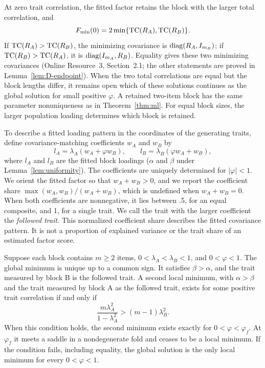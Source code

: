 At zero trait correlation, the fitted factor retains the block with the larger total correlation, and
\[
F_{\min}(0)=2\min\{\operatorname{TC}(R_A),\operatorname{TC}(R_B)\}.
\]
If $\operatorname{TC}(R_A)>\operatorname{TC}(R_B)$, the minimizing covariance is $\operatorname{diag}(R_A,I_{m_B})$; if $\operatorname{TC}(R_B)>\operatorname{TC}(R_A)$, it is $\operatorname{diag}(I_{m_A},R_B)$. Equality gives these two minimizing covariances (Online Resource~3, Section~2.1; the other statements are proved in Lemma~\ref{lem:D-endpoint}). When the two total correlations are equal but the block lengths differ, it remains open which of these solutions continues as the global solution for small positive $\varphi$. A retained two-item block has the same parameter nonuniqueness as in Theorem~\ref{thm:ml}. For equal block sizes, the larger population loading determines which block is retained.

To describe a fitted loading pattern in the coordinates of the generating traits, define covariance-matching coefficients $w_A$ and $w_B$ by
\[
l_A=\lambda_A(w_A+\varphi w_B),\qquad
l_B=\lambda_B(\varphi w_A+w_B),
\]
where $l_A$ and $l_B$ are the fitted block loadings ($\alpha$ and $\beta$ under Lemma~\ref{lem:uniformity}). The coefficients are uniquely determined for $|\varphi|<1$. We orient the fitted factor so that $w_A+w_B>0$, and we report the coefficient share $\max(w_A,w_B)/(w_A+w_B)$, which is undefined when $w_A+w_B=0$. When both coefficients are nonnegative, it lies between .5, for an equal composite, and 1, for a single trait. We call the trait with the larger coefficient the \emph{followed trait}. This normalized coefficient share describes the fitted covariance pattern. It is not a proportion of explained variance or the trait share of an estimated factor score.

\begin{proposition}
\label{prop:unequal}
Suppose each block contains $m\ge2$ items, $0<\lambda_A<\lambda_B<1$, and $0<\varphi<1$. The global minimum is unique up to a common sign. It satisfies $\beta>\alpha$, and the trait measured by block B is the followed trait. A second local minimum, with $\alpha>\beta$ and the trait measured by block A as the followed trait, exists for some positive trait correlation if and only if
\begin{equation}
\frac{m\lambda_A^2}{1-\lambda_A^2}>(m-1)\lambda_B^2.
\label{eq:weaker-minimum-condition}
\end{equation}
When this condition holds, the second minimum exists exactly for $0<\varphi<\varphi_f$. At $\varphi_f$ it meets a saddle in a nondegenerate fold and ceases to be a local minimum. If the condition fails, including equality, the global solution is the only local minimum for every $0<\varphi<1$.

\end{proposition}

